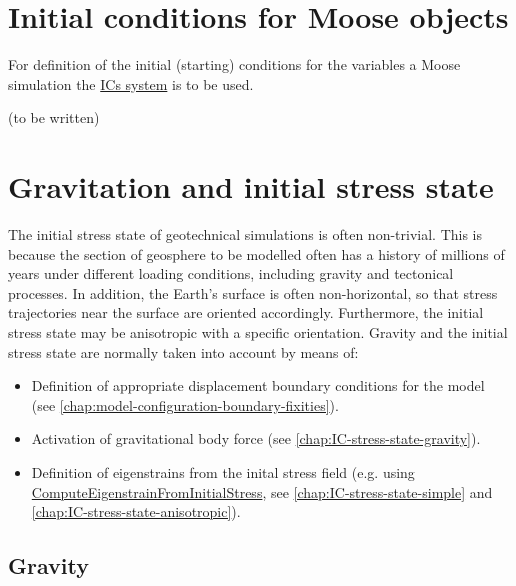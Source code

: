 \section{Initial conditions for Moose objects}
\label{chap:IC-moose-objects}

For definition of the initial (starting) conditions for the variables a Moose
simulation the \href{https://mooseframework.inl.gov/syntax/ICs}{ICs system} is
to be used.

(to be written)

\section{Gravitation and initial stress state}
\label{chap:IC-stress-state}

The initial stress state of geotechnical simulations is often non-trivial. This
is because the section of geosphere to be modelled often has a history of
millions of years under different loading conditions, including gravity and
tectonical processes. In addition, the Earth's surface is often non-horizontal,
so that stress trajectories near the surface are oriented accordingly.
Furthermore, the initial stress state may be anisotropic with a specific
orientation. Gravity and the initial stress state are normally taken into
account by means of:

\begin{itemize}
    \item Definition of appropriate displacement boundary conditions for the model (see
          \autoref{chap:model-configuration-boundary-fixities}).
    \item Activation of gravitational body force (see
          \autoref{chap:IC-stress-state-gravity}).
    \item Definition of eigenstrains from the inital stress field (e.g. using
          \href{https://mooseframework.inl.gov/source/materials/ComputeEigenstrainFromInitialStress.html}{ComputeEigenstrainFromInitialStress},
          see \autoref{chap:IC-stress-state-simple} and
          \autoref{chap:IC-stress-state-anisotropic}).
\end{itemize}

\subsection{Gravity}
\label{chap:IC-stress-state-gravity}

